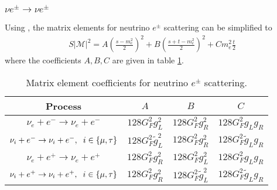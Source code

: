 \subsubsection{ $\nu e^\pm\rightarrow \nu e^\pm$}
 Using , the matrix elements for neutrino $e^\pm$ scattering can be simplified to
\begin{align}
S|\mathcal{M}|^2=A\left(\frac{s-m_e^2}{2}\right)^2+B\left(\frac{s+t-m_e^2}{2}\right)^2+Cm_e^2\frac{t}{2}
\end{align}
 where the coefficients $A,B,C$ are given in table \ref{table:nu_e_coeff}.

\begin{table}[ht]
\centering 
\begin{tabular}{|c|c|c|c|}
\hline
Process &$A$&$B$&$C$  \\
\hline
$\nu_e+e^-\rightarrow \nu_e+e^-$&$128G_F^2g_L^2$&$128G_F^2g_R^2$&$128G_F^2g_Lg_R$\\
\hline
$\nu_i+e^-\rightarrow \nu_i+e^-,\hspace{2mm} i\in\{\mu,\tau\}$&$128G_F^2\tilde g_L^2$&$128G_F^2g_R^2$&$128G_F^2\tilde g_Lg_R$\\
\hline
$\nu_e+e^+\rightarrow \nu_e+e^+$&$128G_F^2g_R^2$&$128G_F^2g_L^2$&$128G_F^2g_Lg_R$\\
\hline
$\nu_i+e^+\rightarrow \nu_i+e^+,\hspace{2mm} i\in\{\mu,\tau\}$&$128G_F^2 g_R^2$&$128G_F^2\tilde g_L^2$&$128G_F^2\tilde g_Lg_R$\\
\hline
\end{tabular}
\caption{Matrix element coefficients for neutrino $e^\pm$ scattering.}
\label{table:nu_e_coeff}
\end{table}



